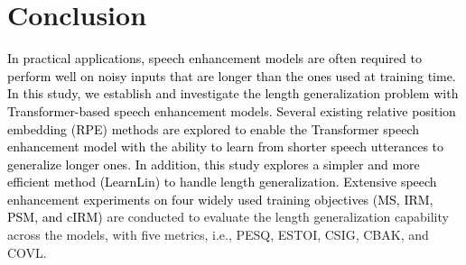 \documentclass[journal]{IEEEtran}
\begin{document}
% 


 



\section{Conclusion}\label{sec:8}
\textcolor{black}{In practical applications, speech enhancement models are often required to perform well on noisy inputs that are longer than the ones used at training time. In this study, we establish and investigate the length generalization problem with Transformer-based speech enhancement models. Several existing relative position embedding (RPE) methods are explored to enable the Transformer speech enhancement model with the ability to learn from shorter speech utterances to generalize longer ones. In addition, this study explores a simpler and more efficient method (LearnLin) to handle length generalization. Extensive speech enhancement experiments on four widely used training objectives (MS, IRM, PSM, and cIRM)} are conducted to evaluate the length generalization capability across the models, with five metrics, i.e., PESQ, ESTOI, CSIG, CBAK, and COVL.
\end{document}
